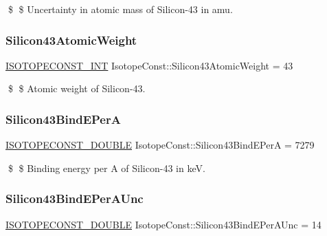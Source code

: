 \$ \$ Uncertainty in atomic mass of Silicon-\/43 in amu. \mbox{\label{group___isotope_const-_silicon-_si43_ga78da50c8e372d4f4d1375a2f36af4efa}} 
\subsubsection{\texorpdfstring{Silicon43\+Atomic\+Weight}{Silicon43AtomicWeight}}
{\footnotesize\ttfamily \mbox{\hyperlink{group___isotope_const-_macros_ga5f18360b3e99483a35c32d789e62621c}{I\+S\+O\+T\+O\+P\+E\+C\+O\+N\+S\+T\+\_\+\+I\+NT}} Isotope\+Const\+::\+Silicon43\+Atomic\+Weight = 43}

\$ \$ Atomic weight of Silicon-\/43. \mbox{\label{group___isotope_const-_silicon-_si43_gabe46708f4b5806e59be9d58ba4e32299}} 
\subsubsection{\texorpdfstring{Silicon43\+Bind\+E\+PerA}{Silicon43BindEPerA}}
{\footnotesize\ttfamily \mbox{\hyperlink{group___isotope_const-_macros_ga8f45a7272ce02c0b4c65c44636ed719a}{I\+S\+O\+T\+O\+P\+E\+C\+O\+N\+S\+T\+\_\+\+D\+O\+U\+B\+LE}} Isotope\+Const\+::\+Silicon43\+Bind\+E\+PerA = 7279}

\$ \$ Binding energy per A of Silicon-\/43 in keV. \mbox{\label{group___isotope_const-_silicon-_si43_gaa71578d121810f8e69e4a9d4627f2333}} 
\subsubsection{\texorpdfstring{Silicon43\+Bind\+E\+Per\+A\+Unc}{Silicon43BindEPerAUnc}}
{\footnotesize\ttfamily \mbox{\hyperlink{group___isotope_const-_macros_ga8f45a7272ce02c0b4c65c44636ed719a}{I\+S\+O\+T\+O\+P\+E\+C\+O\+N\+S\+T\+\_\+\+D\+O\+U\+B\+LE}} Isotope\+Const\+::\+Silicon43\+Bind\+E\+Per\+A\+Unc = 14}

